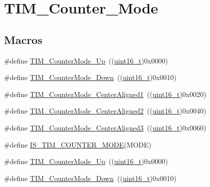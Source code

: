 \hypertarget{group___t_i_m___counter___mode}{}\section{T\+I\+M\+\_\+\+Counter\+\_\+\+Mode}
\label{group___t_i_m___counter___mode}
\subsection*{Macros}
\begin{DoxyCompactItemize}
\item 
\#define \hyperlink{group___t_i_m___counter___mode_gaf4cd3ce74af3122507b77c8f6e79c832}{T\+I\+M\+\_\+\+Counter\+Mode\+\_\+\+Up}~((\hyperlink{_p_e___types_8h_a1f1825b69244eb3ad2c7165ddc99c956}{uint16\+\_\+t})0x0000)
\item 
\#define \hyperlink{group___t_i_m___counter___mode_gadd7c4200d185bdcd9e64ae80e6b200b0}{T\+I\+M\+\_\+\+Counter\+Mode\+\_\+\+Down}~((\hyperlink{_p_e___types_8h_a1f1825b69244eb3ad2c7165ddc99c956}{uint16\+\_\+t})0x0010)
\item 
\#define \hyperlink{group___t_i_m___counter___mode_gac07392e9637f8a0d115d4ba9a002ae93}{T\+I\+M\+\_\+\+Counter\+Mode\+\_\+\+Center\+Aligned1}~((\hyperlink{_p_e___types_8h_a1f1825b69244eb3ad2c7165ddc99c956}{uint16\+\_\+t})0x0020)
\item 
\#define \hyperlink{group___t_i_m___counter___mode_ga3793122e4c123a99e46fc2f04acea0d4}{T\+I\+M\+\_\+\+Counter\+Mode\+\_\+\+Center\+Aligned2}~((\hyperlink{_p_e___types_8h_a1f1825b69244eb3ad2c7165ddc99c956}{uint16\+\_\+t})0x0040)
\item 
\#define \hyperlink{group___t_i_m___counter___mode_ga65d9bc01ffa287cd7cf200d08c20a1ce}{T\+I\+M\+\_\+\+Counter\+Mode\+\_\+\+Center\+Aligned3}~((\hyperlink{_p_e___types_8h_a1f1825b69244eb3ad2c7165ddc99c956}{uint16\+\_\+t})0x0060)
\item 
\#define \hyperlink{group___t_i_m___counter___mode_ga9543fec190793e800d5d1b1b853636f5}{I\+S\+\_\+\+T\+I\+M\+\_\+\+C\+O\+U\+N\+T\+E\+R\+\_\+\+M\+O\+DE}(M\+O\+DE)
\item 
\#define \hyperlink{group___t_i_m___counter___mode_gaf4cd3ce74af3122507b77c8f6e79c832}{T\+I\+M\+\_\+\+Counter\+Mode\+\_\+\+Up}~((\hyperlink{_p_e___types_8h_a1f1825b69244eb3ad2c7165ddc99c956}{uint16\+\_\+t})0x0000)
\item 
\#define \hyperlink{group___t_i_m___counter___mode_gadd7c4200d185bdcd9e64ae80e6b200b0}{T\+I\+M\+\_\+\+Counter\+Mode\+\_\+\+Down}~((\hyperlink{_p_e___types_8h_a1f1825b69244eb3ad2c7165ddc99c956}{uint16\+\_\+t})0x0010)

\end{DoxyCompactItemize}
